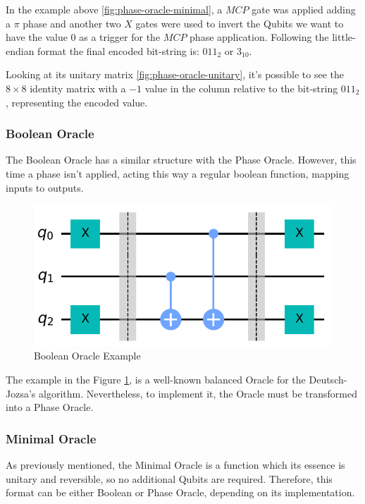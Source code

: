 \documentclass{article}
\begin{document}
In the example above \ref{fig:phase-oracle-minimal}, a $MCP$ gate was applied adding a $\pi$ phase and another two $X$ gates were used to invert the Qubits we want to have the value $0$ as a trigger for the $MCP$ phase application. Following the little-endian format the final encoded bit-string is: $011_{2}$ or $3_{10}$.

Looking at its unitary matrix \ref{fig:phase-oracle-unitary}, it's possible to see the $8\times8$ identity matrix with a $-1$ value in the column relative to the bit-string $011_{2}$, representing the encoded value.

\subsubsection{Boolean Oracle}

The Boolean Oracle has a similar structure with the Phase Oracle. However, this time a phase isn't applied, acting this way a regular boolean function, mapping inputs to outputs.

\begin{figure}[h]
	\centering
	\includegraphics[scale=0.3]{balanced-oracle.png}
	\caption{Boolean Oracle Example}
	\label{fig:boolean-oracle}
\end{figure}

The example in the Figure \ref{fig:boolean-oracle}, is a well-known balanced Oracle for the Deutsch-Jozsa's algorithm. Nevertheless, to implement it, the Oracle must be transformed into a Phase Oracle.

\subsubsection{Minimal Oracle}
As previously mentioned, the Minimal Oracle is a function which its essence is unitary and reversible, so no additional Qubits are required. Therefore, this format can be either Boolean or Phase Oracle, depending on its implementation.
\end{document}
